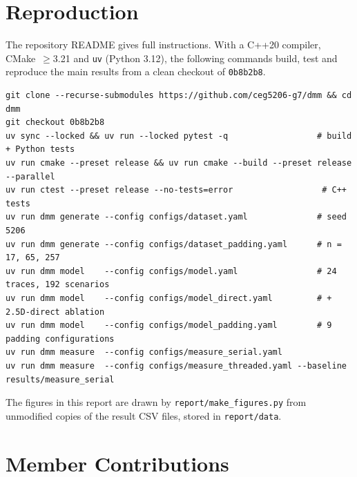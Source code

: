 \documentclass[11pt,a4paper]{article}
\newcommand{\code}[1]{\texttt{#1}}
\begin{document}
\section*{Reproduction}

The repository README gives full instructions. With a C++20 compiler, CMake~$\ge$3.21 and \code{uv}
(Python 3.12), the following commands build, test and reproduce the main results from a clean checkout of
\code{0b8b2b8}.

\begin{small}
\begin{verbatim}
git clone --recurse-submodules https://github.com/ceg5206-g7/dmm && cd dmm
git checkout 0b8b2b8
uv sync --locked && uv run --locked pytest -q                  # build + Python tests
uv run cmake --preset release && uv run cmake --build --preset release --parallel
uv run ctest --preset release --no-tests=error                  # C++ tests
uv run dmm generate --config configs/dataset.yaml              # seed 5206
uv run dmm generate --config configs/dataset_padding.yaml      # n = 17, 65, 257
uv run dmm model    --config configs/model.yaml                # 24 traces, 192 scenarios
uv run dmm model    --config configs/model_direct.yaml         # + 2.5D-direct ablation
uv run dmm model    --config configs/model_padding.yaml        # 9 padding configurations
uv run dmm measure  --config configs/measure_serial.yaml
uv run dmm measure  --config configs/measure_threaded.yaml --baseline results/measure_serial
\end{verbatim}
\end{small}

\noindent The figures in this report are drawn by \code{report/make\_figures.py} from unmodified copies
of the result CSV files, stored in \code{report/data}.

\section*{Member Contributions}
\end{document}
